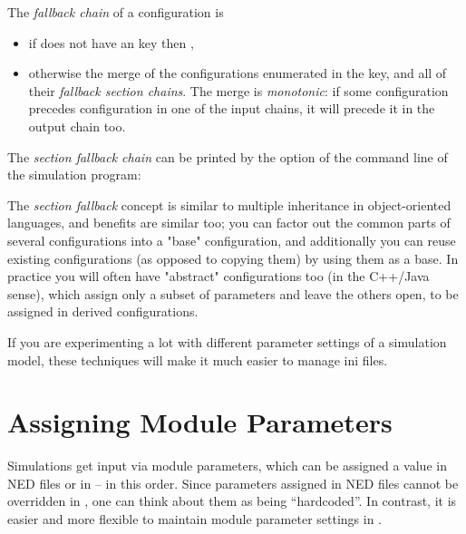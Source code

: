 The \textit{fallback chain} of a configuration  is
\begin{itemize}
  \item{if  does not have an  key then
        , }
  \item{otherwise the merge of the configurations enumerated in
        the  key, and all of their
        \textit{fallback section chains}.
        The merge is \textit{monotonic}: if some configuration 
        precedes configuration  in one of the input chains,
        it will precede it in the output chain too. }
\end{itemize}

The \textit{section fallback chain} can be printed by the  option
of the command line of the simulation program:



The \textit{section fallback} concept is similar to multiple inheritance
in object-oriented languages,
and benefits are similar too; you can factor out the common parts of
several configurations into a "base"
configuration, and additionally you can reuse existing
configurations (as opposed to copying them) by using them as a base. In
practice you will often have "abstract"
configurations too (in the C++/Java sense), which assign only a subset
of parameters and leave the others open, to be assigned in derived
configurations.

If you are experimenting a lot with different parameter settings of a
simulation model, these techniques will make it much easier to manage
ini files.

\section{Assigning Module Parameters}
\label{sec:ch-config-sim:parameter-settings}

Simulations get input via module parameters, which can be assigned a
value in NED files or in  -- in this order. Since parameters
assigned in NED files cannot be overridden in , one can
think about them as being ``hardcoded''. In contrast, it is easier
and more flexible to maintain module parameter settings in .

